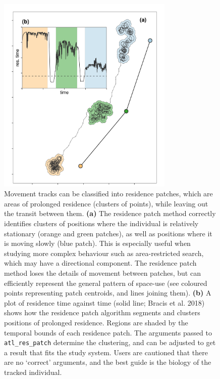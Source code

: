 \documentclass[10pt,paper=a4,headings=standardclasses
]{scrartcl}
\begin{document}
\begin{figure}[h!]
    \centering
    \includegraphics[width=0.75\textwidth]{figures/fig_05_residence.png}
    \caption{Movement tracks can be classified into residence patches, which are areas of prolonged residence (clusters of points), while leaving out the transit between them.
    \textbf{(a)} The residence patch method correctly identifies clusters of positions where the individual is relatively stationary (orange and green patches), as well as positions where it is moving slowly (blue patch).
    This is especially useful when studying more complex behaviour such as area-restricted search, which may have a directional component.
    The residence patch method loses the details of movement between patches, but can efficiently represent the general pattern of space-use (see coloured points representing patch centroids, and lines joining them).
    \textbf{(b)} A plot of residence time against time (solid line; Bracis et al. 2018) shows how the residence patch algorithm segments and clusters positions of prolonged residence. 
    Regions are shaded by the temporal bounds of each residence patch.
    The arguments passed to \texttt{atl\_res\_patch} determine the clustering, and can be adjusted to get a result that fits the study system.
    Users are cautioned that there are no `correct' arguments, and the best guide is the biology of the tracked individual.}
    \label{fig:figure_residence_patch}
\end{figure}
\end{document}
